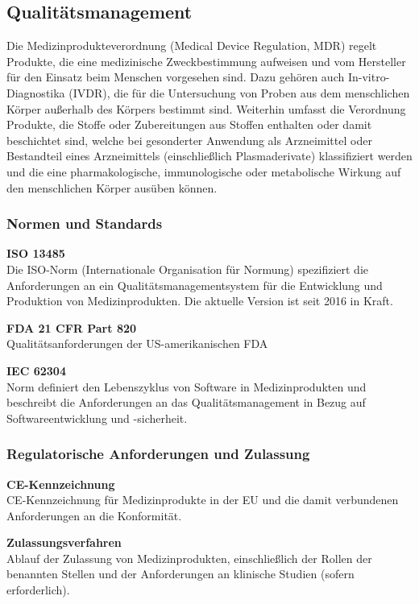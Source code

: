 \documentclass[a4paper, 12pt]{article}
\begin{document}
\newpage
\subsection{Qualitätsmanagement}\label{Qualitätsmanagement}
Die Medizinprodukteverordnung (Medical Device Regulation, MDR) regelt Produkte, die eine medizinische Zweckbestimmung aufweisen und vom Hersteller für den Einsatz beim Menschen vorgesehen sind. Dazu gehören auch In-vitro-Diagnostika (IVDR), die für die Untersuchung von Proben aus dem menschlichen Körper außerhalb des Körpers bestimmt sind. Weiterhin umfasst die Verordnung Produkte, die Stoffe oder Zubereitungen aus Stoffen enthalten oder damit beschichtet sind, welche bei gesonderter Anwendung als Arzneimittel oder Bestandteil eines Arzneimittels (einschließlich Plasmaderivate) klassifiziert werden und die eine pharmakologische, immunologische oder metabolische Wirkung auf den menschlichen Körper ausüben können. \cite{gesund_minist}

\subsubsection{Normen und Standards}
{\bfseries ISO 13485}\\
Die ISO-Norm (Internationale Organisation für Normung) spezifiziert die Anforderungen an ein Qualitätsmanagementsystem für die Entwicklung und Produktion von Medizinprodukten. Die aktuelle Version ist seit 2016 in Kraft. 

{\bfseries FDA 21 CFR Part 820}\\
Qualitätsanforderungen der US-amerikanischen FDA

{\bfseries IEC 62304}\\
Norm definiert den Lebenszyklus von Software in Medizinprodukten und beschreibt die Anforderungen an das Qualitätsmanagement in Bezug auf Softwareentwicklung und -sicherheit.

\subsubsection{Regulatorische Anforderungen und Zulassung}
{\bfseries CE-Kennzeichnung}\\
CE-Kennzeichnung für Medizinprodukte in der EU und die damit verbundenen Anforderungen an die Konformität.

{\bfseries Zulassungsverfahren}\\
Ablauf der Zulassung von Medizinprodukten, einschließlich der Rollen der benannten Stellen und der Anforderungen an klinische Studien (sofern erforderlich).
\end{document}
